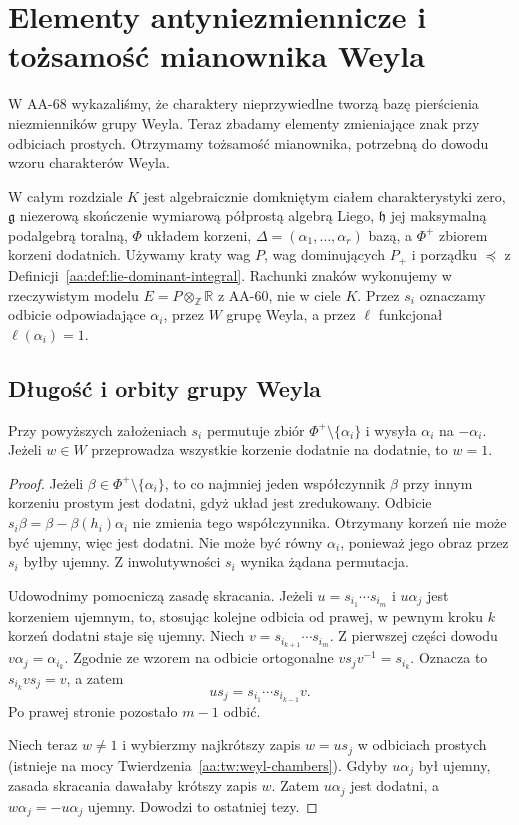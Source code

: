 \chapter[Mianownik Weyla]{Elementy antyniezmiennicze i tożsamość mianownika Weyla}
\label{aa:ch:weyl-denominator}

W AA-68 wykazaliśmy, że charaktery nieprzywiedlne tworzą bazę pierścienia niezmienników grupy Weyla. Teraz zbadamy elementy zmieniające znak przy odbiciach prostych. Otrzymamy tożsamość mianownika, potrzebną do dowodu wzoru charakterów Weyla.

W całym rozdziale $K$ jest algebraicznie domkniętym ciałem charakterystyki zero, $\mathfrak g$ niezerową skończenie wymiarową półprostą algebrą Liego, $\mathfrak h$ jej maksymalną podalgebrą toralną, $\Phi$ układem korzeni, $\Delta=(\alpha_1,\ldots,\alpha_r)$ bazą, a $\Phi^+$ zbiorem korzeni dodatnich. Używamy kraty wag $P$, wag dominujących $P_+$ i porządku $\preceq$ z Definicji~\ref{aa:def:lie-dominant-integral}. Rachunki znaków wykonujemy w rzeczywistym modelu $E=P\otimes_{\mathbb Z}\mathbb R$ z AA-60, nie w ciele $K$. Przez $s_i$ oznaczamy odbicie odpowiadające $\alpha_i$, przez $W$ grupę Weyla, a przez $\ell$ funkcjonał $\ell(\alpha_i)=1$.

\section{Długość i orbity grupy Weyla}

\begin{lemat}
\label{aa:lem:weyl-positive-permutation}
Przy powyższych założeniach $s_i$ permutuje zbiór $\Phi^+\setminus\{\alpha_i\}$ i wysyła $\alpha_i$ na $-\alpha_i$. Jeżeli $w\in W$ przeprowadza wszystkie korzenie dodatnie na dodatnie, to $w=1$.
\end{lemat}
\begin{proof}
Jeżeli $\beta\in\Phi^+\setminus\{\alpha_i\}$, to co najmniej jeden współczynnik $\beta$ przy innym korzeniu prostym jest dodatni, gdyż układ jest zredukowany. Odbicie $s_i\beta=\beta-\beta(h_i)\alpha_i$ nie zmienia tego współczynnika. Otrzymany korzeń nie może być ujemny, więc jest dodatni. Nie może być równy $\alpha_i$, ponieważ jego obraz przez $s_i$ byłby ujemny. Z inwolutywności $s_i$ wynika żądana permutacja.

Udowodnimy pomocniczą zasadę skracania. Jeżeli $u=s_{i_1}\cdots s_{i_m}$ i $u\alpha_j$ jest korzeniem ujemnym, to, stosując kolejne odbicia od prawej, w pewnym kroku $k$ korzeń dodatni staje się ujemny. Niech $v=s_{i_{k+1}}\cdots s_{i_m}$. Z pierwszej części dowodu $v\alpha_j=\alpha_{i_k}$. Zgodnie ze wzorem na odbicie ortogonalne $v s_j v^{-1}=s_{i_k}$. Oznacza to $s_{i_k}v s_j=v$, a zatem
\[
 u s_j=s_{i_1}\cdots s_{i_{k-1}}v.
\]
Po prawej stronie pozostało $m-1$ odbić.

Niech teraz $w\ne1$ i wybierzmy najkrótszy zapis $w=u s_j$ w odbiciach prostych (istnieje na mocy Twierdzenia~\ref{aa:tw:weyl-chambers}). Gdyby $u\alpha_j$ był ujemny, zasada skracania dawałaby krótszy zapis $w$. Zatem $u\alpha_j$ jest dodatni, a $w\alpha_j=-u\alpha_j$ ujemny. Dowodzi to ostatniej tezy.
\end{proof}

